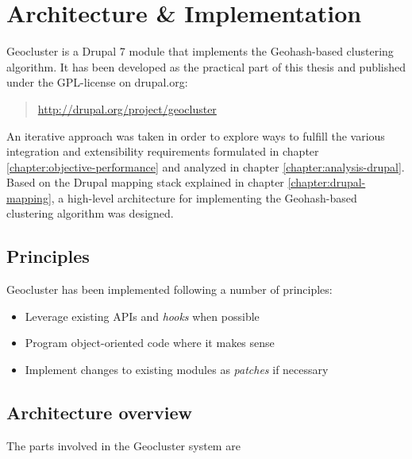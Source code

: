 
%
%

\section{Architecture \& Implementation}
\label{chapter:architecture-implementation}

Geocluster is a Drupal 7 module that implements the Geohash-based clustering algorithm. It has been developed as the practical part of this thesis and published under the GPL-license on drupal.org:

\begin{quote}
\url{http://drupal.org/project/geocluster}
\end{quote}
 
An iterative approach was taken in order to explore ways to fulfill the various integration and extensibility requirements formulated in chapter \ref{chapter:objective-performance} and analyzed in chapter \ref{chapter:analysis-drupal}. Based on the Drupal mapping stack explained in chapter \ref{chapter:drupal-mapping}, a high-level architecture for implementing the Geohash-based clustering algorithm was designed.

\subsection{Principles}

Geocluster has been implemented following a number of principles:

\begin{itemize}

\item Leverage existing APIs and \textit{hooks} when possible
\item Program object-oriented code where it makes sense
\item Implement changes to existing modules as \textit{patches} if necessary

\end{itemize}



\subsection{Architecture overview}

The parts involved in the Geocluster system are

